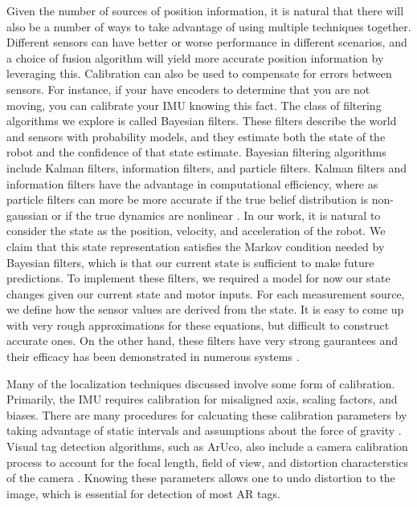\documentclass{article}
\begin{document}
  Given the number of sources of position information, it is natural that there will also be a number of ways to take advantage of using multiple techniques together. Different sensors can have better or worse performance in different scenarios, and a choice of fusion algorithm will yield more accurate position information by leveraging this. Calibration can also be used to compensate for errors between sensors. For instance, if your have encoders to determine that you are not moving, you can calibrate your IMU knowing this fact. The class of filtering algorithms we explore is called Bayesian filters. These filters describe the world and sensors with probability models, and they estimate both the state of the robot and the confidence of that state estimate. Bayesian filtering algorithms include Kalman filters, information filters, and particle filters. Kalman filters and information filters have the advantage in computational efficiency, where as particle filters can more be more accurate if the true belief distribution is non-gaussian or if the true dynamics are nonlinear \cite{thrun_probabilistic_2005}. In our work, it is natural to consider the state as the position, velocity, and acceleration of the robot. We claim that this state representation satisfies the Markov condition needed by Bayesian filters, which is that our current state is sufficient to make future predictions. To implement these filters, we required a model for now our state changes given our current state and motor inputs. For each measurement source, we define how the sensor values are derived from the state. It is easy to come up with very rough approximations for these equations, but difficult to construct accurate ones. On the other hand, these filters have very strong gaurantees and their efficacy has been demonstrated in numerous systems \cite{chui_kalman_1991}\cite{digiampaolo_mobile_2014}\cite{mirzaei_kalman_2008}\cite{nasa_kalman_1999}\cite{saab_standalone_2011}.

  Many of the localization techniques discussed involve some form of calibration. Primarily, the IMU requires calibration for misaligned axis, scaling factors, and biases. There are many procedures for calcuating these calibration parameters by taking advantage of static intervals and assumptions about the force of gravity \cite{lupton_visual-inertial-aided_2012}\cite{lee_test_2011}\cite{tedaldi_robust_2014}. Visual tag detection algorithms, such as ArUco, also include a camera calibration process to account for the focal length, field of view, and distortion characterstics of the camera \cite{noauthor_opencv:_2017}. Knowing these parameters allows one to undo distortion to the image, which is essential for detection of most AR tags.
\end{document}
